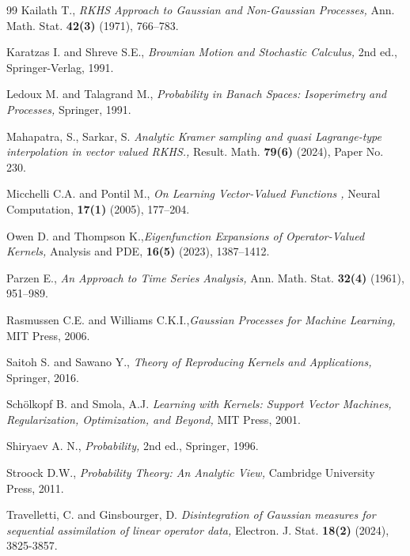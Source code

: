 \documentclass[11pt]{amsart}
\theoremstyle{definition}
\numberwithin{equation}{section}
\begin{document}
\begin{thebibliography}{99}
Kailath T., {\it RKHS Approach to Gaussian and Non-Gaussian Processes,} Ann. Math. Stat. {\bf 42(3)} (1971), 766--783.

Karatzas I. and Shreve S.E., {\it Brownian Motion and Stochastic Calculus,} 2nd ed., Springer-Verlag, 1991.

Ledoux M. and Talagrand M., {\it Probability in Banach Spaces: Isoperimetry and Processes,} Springer, 1991.

Mahapatra, S., Sarkar, S. {\it Analytic Kramer sampling and quasi Lagrange-type interpolation in vector valued RKHS.,} Result. Math. {\bf 79(6)} (2024),  Paper No. 230.

Micchelli C.A. and Pontil M., {\it On Learning Vector-Valued Functions ,} Neural Computation, {\bf 17(1)} (2005), 177--204.

Owen D. and Thompson K.,{\it Eigenfunction Expansions of Operator-Valued Kernels,} Analysis and PDE, {\bf 16(5)} (2023), 1387--1412.

Parzen E., {\it An Approach to Time Series Analysis,} Ann. Math. Stat. {\bf 32(4)} (1961), 951--989.

Rasmussen C.E. and  Williams C.K.I.,{\it Gaussian Processes for Machine Learning,} MIT Press, 2006.

Saitoh S. and Sawano Y., {\it Theory of Reproducing Kernels and Applications,} Springer, 2016.

Sch\"{o}lkopf B. and Smola, A.J. {\it Learning with Kernels: Support Vector Machines, Regularization, Optimization, and Beyond,} MIT Press, 2001.

Shiryaev A. N., {\it Probability,} 2nd ed., Springer, 1996.

Stroock D.W., {\it Probability Theory: An Analytic View,} Cambridge University Press, 2011.

Travelletti, C. and Ginsbourger, D. {\it Disintegration of Gaussian measures for sequential assimilation of linear operator data,} Electron. J. Stat. {\bf 18(2)} (2024), 3825-3857.

\end{thebibliography}
\end{document}

